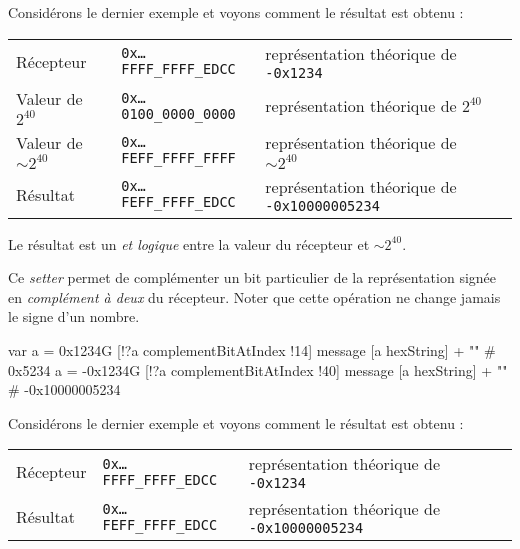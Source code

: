 Considérons le dernier exemple et voyons comment le résultat est obtenu :

\begin{tabular}{llll}
Récepteur & \texttt{0x…FFFF\_FFFF\_EDCC} & représentation théorique de \texttt{-0x1234}\\
Valeur de $2^{40}$ & \texttt{0x…0100\_0000\_0000} & représentation théorique de $2^{40}$ \\
Valeur de $\sim2^{40}$ & \texttt{0x…FEFF\_FFFF\_FFFF} & représentation théorique de $\sim2^{40}$ \\
Résultat & \texttt{0x…FEFF\_FFFF\_EDCC} & représentation théorique de \texttt{-0x10000005234} \\
\end{tabular}

Le résultat est un \emph{et logique} entre la valeur du récepteur et  $\sim2^{40}$.


Ce \emph{setter} permet de complémenter un bit particulier de la représentation signée en \emph{complément à deux} du récepteur. Noter que cette opération ne change jamais le signe d'un nombre.

\begin{galgas}
var a = 0x1234G
[!?a complementBitAtIndex !14]
message [a hexString] + "\n" # 0x5234
a = -0x1234G
[!?a complementBitAtIndex !40]
message [a hexString] + "\n" # -0x10000005234
\end{galgas}

Considérons le dernier exemple et voyons comment le résultat est obtenu :

\begin{tabular}{llll}
Récepteur & \texttt{0x…FFFF\_FFFF\_EDCC} & représentation théorique de \texttt{-0x1234}\\
Résultat & \texttt{0x…FEFF\_FFFF\_EDCC} & représentation théorique de \texttt{-0x10000005234} \\
\end{tabular}

